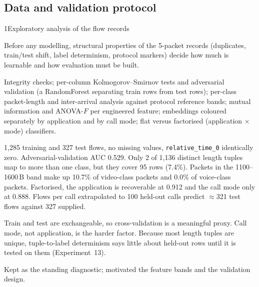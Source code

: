 \subsection{Data and validation protocol}

 
\begin{explog}{1}{Exploratory analysis of the flow records}
\item[Hypothesis] Before any modelling, structural properties of the 5-packet records
(duplicates, train/test shift, label determinism, protocol markers) decide how
much is learnable and how evaluation must be built.
\item[Method] Integrity checks; per-column Kolmogorov--Smirnov tests and adversarial
validation (a RandomForest separating train rows from test rows); per-class
packet-length and inter-arrival analysis against protocol reference bands;
mutual information and ANOVA-$F$ per engineered feature; embeddings coloured
separately by application and by call mode; flat versus factorised
(application $\times$ mode) classifiers.
\item[Result] 1{,}285 training and 327 test flows, no missing values,
\texttt{relative\_time\_0} identically zero. Adversarial-validation AUC 0.529.
Only 2 of 1{,}136 distinct length tuples map to more than one class, but they
cover 95 rows (7.4\%). Packets in the 1100--1600\,B band make up 10.7\% of
video-class packets and 0.0\% of voice-class packets. Factorised, the
application is recoverable at 0.912 and the call mode only at 0.888. Flows per
call extrapolated to 100 held-out calls predict $\approx$321 test flows against
327 supplied.
\item[Inference] Train and test are exchangeable, so cross-validation is a meaningful
proxy. Call mode, not application, is the harder factor. Because most length
tuples are unique, tuple-to-label determinism says little about held-out rows
until it is tested on them (Experiment~13).
\item[Verdict] Kept as the standing diagnostic; motivated the feature bands and the
validation design.
\end{explog}

